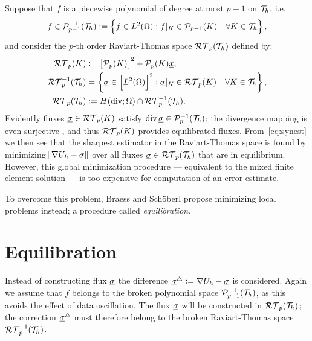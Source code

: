 \documentclass[thesis.tex]{subfiles}
\begin{document}
Suppose that $f$ is a piecewise polynomial of degree at most $p-1$ on $\mathcal{T}_h$, i.e.
\[
  f\in \mathcal{P}_{p-1}^{-1}(\mathcal{T}_h) := \set{ f \in L^2(\Omega): f|_K \in \mathcal{P}_{p-1}(K) \quad \forall K \in \mathcal{T}_h},
\]
and consider the  $p$-th order Raviart-Thomas space $\mathcal{RT}_p(\mathcal{T}_h)$ defined by:
\begin{align*} 
  \mathcal{RT}_p(K)    &:= \left[ \mathcal{P}_p(K)\right]^2 + \mathcal{P}_p(K)\underline{x}, \\
  \mathcal{RT}_p^{-1}(\mathcal{T}_h) &= \set{ \underline{\sigma} \in \left[L^2(\Omega)\right]^2 : \underline{\sigma}|_K \in \mathcal{RT}_p(K) \quad \forall K \in \mathcal{T}_h},\\
  \mathcal{RT}_p(\mathcal{T}_h) &:= H(\operatorname{div}; \Omega) \cap \mathcal{RT}_p^{-1}(\mathcal{T}_h).
\end{align*}
Evidently fluxes $\underline{\sigma} \in \mathcal{RT}_p(K)$ satisfy $\operatorname{div} \underline{\sigma} \in \mathcal{P}_p^{-1}(\mathcal{T}_h)$; the divergence mapping
is even surjective \cite[Prop~2.3.3]{brezzimixed}, and thus $\mathcal{RT}_p(K)$ provides equilibrated fluxes.
 From~\eqref{eq:synest} we then see that 
the sharpest estimator in the Raviart-Thomas space is found by minimizing $\norm{\nabla U_h - \sigma}$ over all 
fluxes $\underline{\sigma} \in \mathcal{RT}_p(\mathcal{T}_h)$ that are in equilibrium. However,
this global minimization procedure --- equivalent to the mixed finite element solution \cite{braess2007finite} --- 
is too expensive for computation of an error estimate.

To overcome this problem, Braess and Sch\"oberl \cite{braessequil} propose minimizing local problems instead; a procedure
called \emph{equilibration}.

\section{Equilibration} 
Instead of constructing flux $\underline{\sigma}$ the difference $\underline{\sigma}^\triangle := \nabla U_h -  \underline{\sigma}$ is considered.
Again we assume that $f$ belongs to the broken polynomial space $\mathcal{P}_{p-1}^{-1}(\mathcal{T}_h)$, as this avoids the effect of
data oscillation.  The flux $\underline{\sigma}$ will be constructed in $\mathcal{RT}_p(\mathcal{T}_h)$; the correction $\underline{\sigma}^\triangle$ must 
therefore belong to the broken Raviart-Thomas space $\mathcal{RT}_p^{-1}(\mathcal{T}_h)$.
\end{document}
